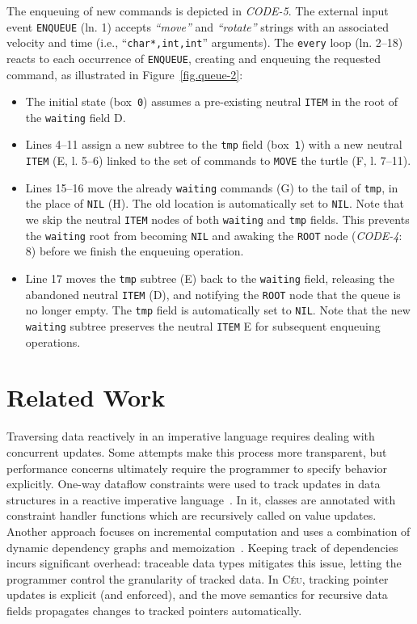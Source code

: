 \documentclass{sig-alternate}
\newcommand{\CEU}{\textsc{C\'{e}u}\xspace}
\newcommand{\code}[1] {{\small{\texttt{#1}}}}
\newcommand{\MM}[1] {\textcircled{\tiny{\textsf{#1}}}}
\begin{document}
The enqueuing of new commands is depicted in \emph{CODE-5}.
The external input event \code{ENQUEUE} (ln. 1) accepts \emph{``move''} and 
\emph{``rotate''} strings with an associated velocity and time (i.e., 
``\code{char*,int,int}'' arguments).
The \code{every} loop (ln. 2--18) reacts to each occurrence of 
\code{ENQUEUE}, creating and enqueuing the requested command, as illustrated in 
Figure~\ref{fig.queue-2}: 
%
\begin{itemize}
%
\item The initial state (box~\code{0}) assumes a pre-existing neutral 
\code{ITEM} in the root of the \code{waiting} field \MM{D}.
%
\item Lines 4--11 assign a new subtree to the \code{tmp} field (box~\code{1}) 
with a new neutral \code{ITEM} (\MM{E}, l. 5--6) linked to the set of 
commands to \code{MOVE} the turtle (\MM{F}, l. 7--11).
%
\item Lines 15--16 move the already \code{waiting} commands (\MM{G}) to the 
tail of \code{tmp}, in the place of \code{NIL} (\MM{H}).
The old location is automatically set to \code{NIL}.
Note that we skip the neutral \code{ITEM} nodes of both \code{waiting} and 
\code{tmp} fields.
This prevents the \code{waiting} root from becoming \code{NIL} and awaking the 
\code{ROOT} node (\emph{CODE-4}: 8) before we finish the enqueuing operation.
%
\item Line 17 moves the \code{tmp} subtree (\MM{E}) back to the \code{waiting} 
field, releasing the abandoned neutral \code{ITEM} (\MM{D}), and notifying the 
\code{ROOT} node that the queue is no longer empty.
The \code{tmp} field is automatically set to \code{NIL}.
Note that the new \code{waiting} subtree preserves the neutral \code{ITEM} 
\MM{E} for subsequent enqueuing operations.
%
\end{itemize}

\section{Related Work}
\label{sec.related}

Traversing data reactively in an imperative language requires dealing with 
concurrent updates.
Some attempts make this process more transparent, but performance concerns 
ultimately require the programmer to specify behavior explicitly.
%
One-way dataflow constraints were used to track updates in data structures in a reactive 
imperative language~\cite{ripdataflow}.
In it, classes are annotated with constraint handler functions which are recursively 
called on value updates.
%
Another approach focuses on incremental computation and uses a combination of 
dynamic dependency graphs and memoization~\cite{selfadjusting}.
Keeping track of dependencies incurs significant overhead: traceable data types
\cite{traceable} mitigates this issue, letting the programmer control the 
granularity of tracked data.
%
In \CEU, tracking pointer updates is explicit (and enforced), and the move 
semantics for recursive data fields propagates changes to tracked pointers 
automatically.
\end{document}
